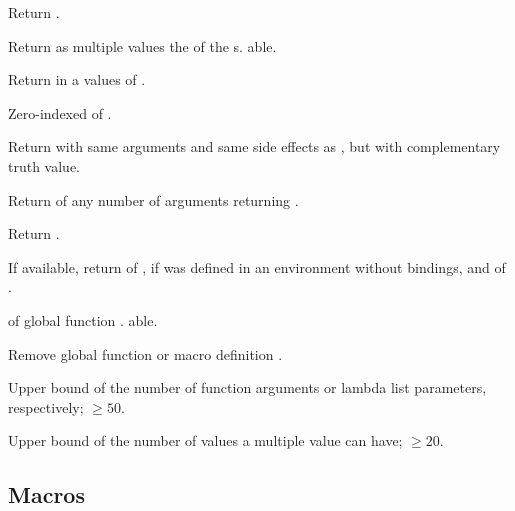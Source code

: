 \begin{LIST}{1cm}
  {
  Return .
  }

  {
  Return as multiple values the  of the
  s. able. 
  }

  {
  Return in a  values of .
  }

  {
  Zero-indexed  of .
  }

  {
  Return  with same arguments and same side effects
  as , but with complementary truth value.
  }

  {
  Return  of any number of arguments returning .
  }

  {
  Return .
  }

  {
  If available, return  of ,
  \retvalii{\NIL} if  was defined in an environment
  without bindings, and  of . 
  }

  {
   of global function . able.
  }

  {
  Remove global function or macro definition .
  }

  {
  Upper bound of the number of function arguments or lambda list
  parameters, respectively; $\geq50$. 
  }

  {
  Upper bound of the number of values a multiple value can have;
  $\geq20$. 
  }

\end{LIST}


\subsection{Macros}
\label{section:Macros}

